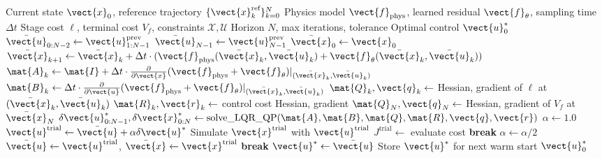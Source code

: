 \begin{algorithm}[H]
\caption{Nonlinear MPC with Hybrid Dynamics Model}
\label{alg:hybrid_mpc_impl}
\begin{algorithmic}[1]
\REQUIRE Current state $\vect{x}_0$, reference trajectory $\{\vect{x}_k^{\text{ref}}\}_{k=0}^{N}$
\REQUIRE Physics model $\vect{f}_{\text{phys}}$, learned residual $\vect{f}_\theta$, sampling time $\Delta t$
\REQUIRE Stage cost $\ell$, terminal cost $V_f$, constraints $\mathcal{X}, \mathcal{U}$
\REQUIRE Horizon $N$, max iterations, tolerance
\ENSURE Optimal control $\vect{u}_0^*$
\STATE
\STATE {}
\STATE $\bar{\vect{u}}_{0:N-2} \gets \vect{u}_{1:N-1}^{\text{prev}}$
\STATE $\bar{\vect{u}}_{N-1} \gets \vect{u}_{N-1}^{\text{prev}}$ 
\STATE
\STATE {}
\STATE $\bar{\vect{x}}_0 \gets \vect{x}_0$
    \STATE $\bar{\vect{x}}_{k+1} \gets \bar{\vect{x}}_k + \Delta t \cdot (\vect{f}_{\text{phys}}(\bar{\vect{x}}_k, \bar{\vect{u}}_k) + \vect{f}_\theta(\bar{\vect{x}}_k, \bar{\vect{u}}_k))$
\ENDFOR
\STATE
{}
    \STATE {}
        \STATE $\mat{A}_k \gets \mat{I} + \Delta t \cdot \frac{\partial}{\partial \vect{x}}(\vect{f}_{\text{phys}} + \vect{f}_\theta)|_{(\bar{\vect{x}}_k, \bar{\vect{u}}_k)}$
        \STATE $\mat{B}_k \gets \Delta t \cdot \frac{\partial}{\partial \vect{u}}(\vect{f}_{\text{phys}} + \vect{f}_\theta)|_{(\bar{\vect{x}}_k, \bar{\vect{u}}_k)}$
    \ENDFOR
    \STATE
    \STATE {}
        \STATE $\mat{Q}_k, \vect{q}_k \gets$ Hessian, gradient of $\ell$ at $(\bar{\vect{x}}_k, \bar{\vect{u}}_k)$
        \STATE $\mat{R}_k, \vect{r}_k \gets$ control cost Hessian, gradient
    \ENDFOR
    \STATE $\mat{Q}_N, \vect{q}_N \gets$ Hessian, gradient of $V_f$ at $\bar{\vect{x}}_N$
    \STATE
    \STATE {}
    \STATE $\delta\vect{u}_{0:N-1}^*, \delta\vect{x}_{0:N}^* \gets \text{solve\_LQR\_QP}(\mat{A}, \mat{B}, \mat{Q}, \mat{R}, \vect{q}, \vect{r})$
    \STATE
    \STATE {}
    \STATE $\alpha \gets 1.0$
        \STATE $\vect{u}^{\text{trial}} \gets \bar{\vect{u}} + \alpha \delta\vect{u}^*$
        \STATE Simulate $\vect{x}^{\text{trial}}$ with $\vect{u}^{\text{trial}}$
        \STATE $J^{\text{trial}} \gets$ evaluate cost
            \STATE \textbf{break}
        \ENDIF
        \STATE $\alpha \gets \alpha / 2$
    \ENDWHILE
    \STATE
    \STATE $\bar{\vect{u}} \gets \vect{u}^{\text{trial}}$, $\bar{\vect{x}} \gets \vect{x}^{\text{trial}}$
    \STATE
    \STATE {}
        \STATE \textbf{break}
    \ENDIF
\ENDFOR
\STATE
\STATE $\vect{u}^* \gets \bar{\vect{u}}$
\STATE Store $\vect{u}^*$ for next warm start
\RETURN $\vect{u}_0^*$
\end{algorithmic}
\end{algorithm}

